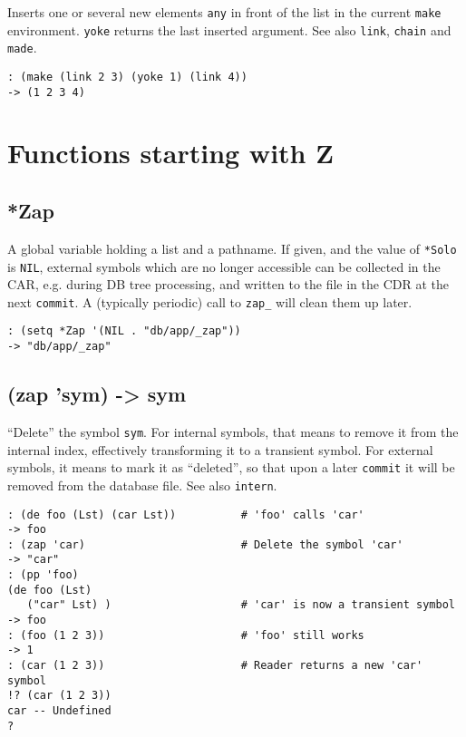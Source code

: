 {{{{{{{{Inserts one or several new elements \texttt{any} in front of the list in the
current \texttt{make} environment. \texttt{yoke} returns the last inserted argument.
See also \texttt{link}, \texttt{chain} and \texttt{made}.


\begin{verbatim}
: (make (link 2 3) (yoke 1) (link 4))
-> (1 2 3 4)
\end{verbatim}



\chapter{Functions starting with Z}
\label{sec-8-1-26}


 
\section{*Zap}
\label{sec-8-1-26-1}


A global variable holding a list and a pathname. If given, and the value
of \texttt{*Solo} is \texttt{NIL}, external symbols which are no longer accessible can
be collected in the CAR, e.g. during DB tree processing, and written to
the file in the CDR at the next \texttt{commit}. A (typically periodic) call to
\texttt{zap\_} will clean them up later.


\begin{verbatim}
: (setq *Zap '(NIL . "db/app/_zap"))
-> "db/app/_zap"
\end{verbatim}

 
\section{(zap 'sym) -> sym}
\label{sec-8-1-26-2}


``Delete'' the symbol \texttt{sym}. For internal symbols, that means to remove it
from the internal index, effectively transforming it to a transient
symbol. For external symbols, it means to mark it as ``deleted'', so that
upon a later \texttt{commit} it will be removed from the database file. See
also \texttt{intern}.


\begin{verbatim}
: (de foo (Lst) (car Lst))          # 'foo' calls 'car'
-> foo
: (zap 'car)                        # Delete the symbol 'car'
-> "car"
: (pp 'foo)
(de foo (Lst)
   ("car" Lst) )                    # 'car' is now a transient symbol
-> foo
: (foo (1 2 3))                     # 'foo' still works
-> 1
: (car (1 2 3))                     # Reader returns a new 'car' symbol
!? (car (1 2 3))
car -- Undefined
?
\end{verbatim}

}}}}}}}}
